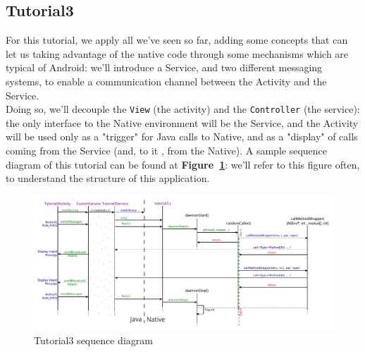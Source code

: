 \documentclass[a4paper,10pt]{article}
\newcommand{\keyword}[1]{\texttt{#1}}
\newcommand{\reff}[1]{\textbf{Figure~\ref{#1}}}
\begin{document}
\begin{multicols}{2}

\section{Tutorial3}

For this tutorial, we apply all we've seen so far, adding some concepts that can
let us taking advantage of the native code through some mechanisms which are
typical of Android: we'll introduce a Service, and two different messaging
systems, to enable a communication channel between the Activity and the Service.
\\Doing so, we'll decouple the \keyword{View} (the activity) and the 
\keyword{Controller} (the service): the only interface to the Native environment
will be the Service, and the Activity will be used only as a "trigger" for Java
calls to Native, and as a "display" of calls coming from the Service (and, to it
, from the Native). A sample sequence diagram of this tutorial can be found at
\reff{fig:tut3-seq}: we'll refer to this figure often, to understand the
structure of this application.

\begin{figure}[t]
 \includegraphics[width=17cm]{./figures/sequence_t3.pdf}
 \caption{Tutorial3 sequence diagram}
 \label{fig:tut3-seq}
\end{figure}


\end{multicols}
\end{document}
